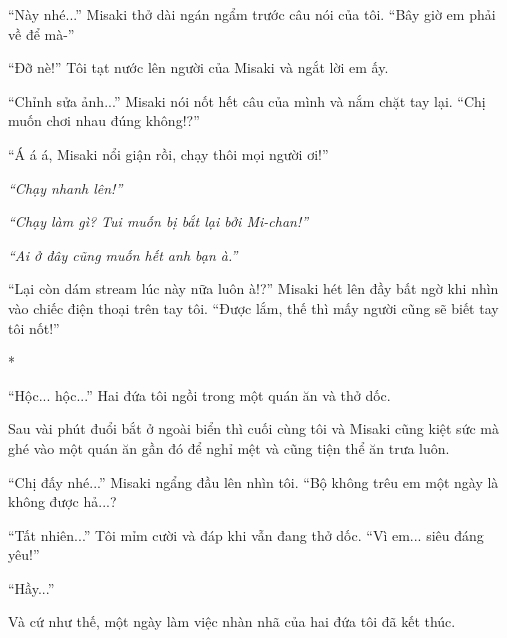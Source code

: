 {``Này nhé...'' Misaki thở dài ngán ngẩm trước câu nói của tôi. ``Bây giờ
em phải về để mà-''

``Đỡ nè!'' Tôi tạt nước lên người của Misaki và ngắt lời em ấy.

``Chỉnh sửa ảnh...'' Misaki nói nốt hết câu của mình và nắm chặt tay
lại. ``Chị muốn chơi nhau đúng không!?''

``Á á á, Misaki nổi giận rồi, chạy thôi mọi người ơi!''

\emph{``Chạy nhanh lên!''}

\emph{``Chạy làm gì? Tui muốn bị bắt lại bởi Mi-chan!''}

\emph{``Ai ở đây cũng muốn hết anh bạn à.''}

``Lại còn dám stream lúc này nữa luôn à!?'' Misaki hét lên đầy bất ngờ
khi nhìn vào chiếc điện thoại trên tay tôi. ``Được lắm, thế thì mấy
người cũng sẽ biết tay tôi nốt!''

*

``Hộc... hộc...'' Hai đứa tôi ngồi trong một quán ăn và thở dốc.

Sau vài phút đuổi bắt ở ngoài biển thì cuối cùng tôi và Misaki cũng kiệt
sức mà ghé vào một quán ăn gần đó để nghỉ mệt và cũng tiện thể ăn trưa
luôn.

``Chị đấy nhé...'' Misaki ngẩng đầu lên nhìn tôi. ``Bộ không trêu em một
ngày là không được hả...?

``Tất nhiên...'' Tôi mỉm cười và đáp khi vẫn đang thở dốc. ``Vì em...
siêu đáng yêu!''

``Hầy...''

Và cứ như thế, một ngày làm việc nhàn nhã của hai đứa tôi đã kết thúc.
}